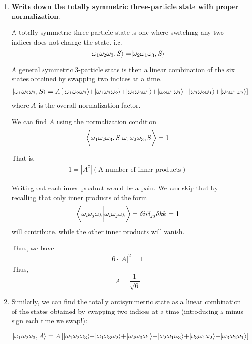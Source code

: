 \documentclass[twoside]{article}
\begin{document}
\begin{enumerate}
   \item \textbf{Write down the totally symmetric three-particle state with proper normalization:}
   
   A totally symmetric three-particle state is one where switching any two indices does not change the state. i.e.
   \[ \rvert\omega_1 \omega_2 \omega_3, S\rangle = \rvert\omega_2 \omega_1 \omega_3, S\rangle \]

   A general symmetric 3-particle state is then a linear combination of the six states obtained by swapping two indices at a time.
   \begin{align*}
      \rvert\omega_1 \omega_2 \omega_3, S\rangle = A \left[ \rvert\omega_1 \omega_2 \omega_3\rangle + \rvert\omega_1 \omega_3 \omega_2\rangle + \rvert\omega_2 \omega_3 \omega_1\rangle + \rvert\omega_2 \omega_1 \omega_3\rangle + \rvert\omega_3 \omega_2 \omega_1\rangle + \rvert\omega_3 \omega_1 \omega_2\rangle  \right]
   \end{align*}
   where $A$ is the overall normalization factor.

   We can find $A$ using the normalization condition 
   \[ \left\langle \omega_1 \omega_2 \omega_3, S \bigg\rvert \omega_1 \omega_2 \omega_3, S \right\rangle = 1 \]

   That is,
   \begin{align*}
      1 = |A^2| \left(\text{A number of inner products} \right)
   \end{align*}

   Writing out each inner product would be a pain. We can skip that by recalling that only inner products of the form 
   \[ \left\langle \omega_i \omega_j \omega_k \bigg\rvert \omega_i \omega_j \omega_k \right\rangle = \delta{ii}\delta_{jj}\delta{kk} = 1\]
   will contribute, while the other inner products will vanish.

   Thus, we have 
   \begin{align}
      6 \cdot |A|^2 = 1
   \end{align}
   Thus,
   \[ \boxed{A = \frac{1}{\sqrt{6}}} \]
   
   \item Similarly, we can find the totally antisymmetric state as a linear combination of the states obtained by swapping two indices at a time (introducing a minus sign each time we swap!):
   
   \begin{align*}
      \rvert\omega_1 \omega_2 \omega_3, A\rangle = A \left[ \rvert\omega_1 \omega_2 \omega_3\rangle - \rvert\omega_1 \omega_3 \omega_2\rangle + \rvert\omega_2 \omega_3 \omega_1\rangle - \rvert\omega_2 \omega_1 \omega_3\rangle + \rvert\omega_3 \omega_1 \omega_2\rangle - \rvert\omega_3 \omega_2 \omega_1\rangle  \right]
   \end{align*}


\end{enumerate}
\end{document}
